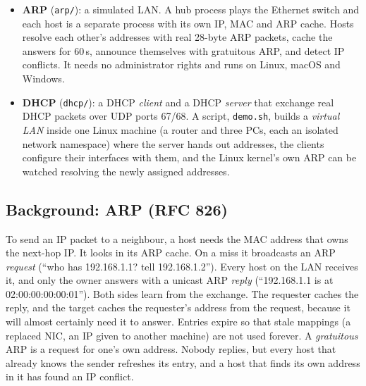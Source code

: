 \documentclass[11pt]{article}
\begin{document}
\begin{itemize}[leftmargin=1.6em]
  \item \textbf{ARP} (\texttt{arp/}): a simulated LAN. A hub process plays the Ethernet
  switch and each host is a separate process with its own IP, MAC and ARP cache. Hosts
  resolve each other's addresses with real 28-byte ARP packets, cache the answers for
  60\,s, announce themselves with gratuitous ARP, and detect IP conflicts. It needs no
  administrator rights and runs on Linux, macOS and Windows.
  \item \textbf{DHCP} (\texttt{dhcp/}): a DHCP \emph{client} and a DHCP \emph{server}
  that exchange real DHCP packets over UDP ports 67/68. A script, \texttt{demo.sh}, builds
  a \emph{virtual LAN} inside one Linux machine (a router and three PCs, each an isolated
  network namespace) where the server hands out addresses, the clients configure their
  interfaces with them, and the Linux kernel's own ARP can be watched resolving the newly
  assigned addresses.
\end{itemize}

\subsection{Background: ARP (RFC 826)}
To send an IP packet to a neighbour, a host needs the MAC address that owns the next-hop
IP. It looks in its ARP cache. On a miss it broadcasts an ARP \emph{request} (``who has
192.168.1.1? tell 192.168.1.2''). Every host on the LAN receives it, and only the owner
answers with a unicast ARP \emph{reply} (``192.168.1.1 is at 02:00:00:00:00:01''). Both
sides learn from the exchange. The requester caches the reply, and the target caches the
requester's address from the request, because it will almost certainly need it to answer.
Entries expire so that stale mappings (a replaced NIC, an IP given to another machine) are
not used forever. A \emph{gratuitous} ARP is a request for one's own address. Nobody
replies, but every host that already knows the sender refreshes its entry, and a host
that finds its own address in it has found an IP conflict.
\end{document}

